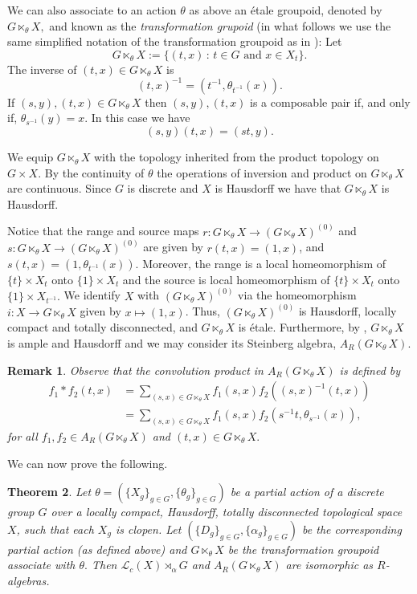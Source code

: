 \documentclass[11pt, a4paper]{amsart}
\newcommand{\Gx}{\ensuremath {G \ltimes_\theta X}}
\newcommand{\Lg}{\ensuremath {\mathcal{L}_c(X)\rtimes_{\alpha} G}}
\theoremstyle{plain}
\newtheorem{theorem}{Theorem}[section]
\newtheorem{remark}[theorem]{Remark}
\begin{document}


We can also associate to an action $\theta$ as above an \'{e}tale groupoid, denoted by $\Gx,$ and known as the \emph{transformation grupoid}  (in what follows we use the same simplified notation of the transformation groupoid as in \cite{Abadie}): Let
 $$\Gx:= \{(t,x) \, : \, t \in G \,\, \mbox{and} \,\, x \in X_t \}.$$
The inverse of $(t, x) \in \Gx$ is 
$$(t, x)^{-1}=(t^{-1}, \theta_{t^{-1}}(x)).$$
If $(s,y), (t,x) \in \Gx$ then $(s,y), (t,x) $ is a composable pair if, and only if, $\theta_{s^{-1}}(y)=x.$ In this case we have
$$(s,y)(t,x)=(st, y).$$

We equip $\Gx$ with the topology inherited from the product topology on $G \times X.$  By the continuity of $\theta$ the
operations of inversion and product on $\Gx$ are continuous. Since $G$ is discrete and $X$ is Hausdorff we have that $\Gx$ is Hausdorff. 

Notice that the range and source maps $r: \Gx \rightarrow  (\Gx)^{(0)}$ and $s : \Gx \rightarrow (\Gx)^{(0)}$ are given by $r(t,x) =(1,x)$, and $s(t,x)=(1, \theta_{t^{-1}}(x)).$ Moreover, the range is a local homeomorphism of $\{t\} \times X_t$ onto $\{1\} \times X_t$  and the source is local homeomorphism of $\{t\} \times X_t$ onto $\{1\} \times X_{t^{-1}}.$ We identify $X$ with $(\Gx)^{(0)}$ via the homeomorphism $i: X \rightarrow \Gx$ given by $x \mapsto (1, x)$. Thus, $(\Gx)^{(0)}$ is Hausdorff, locally compact and totally disconnected, and $\Gx$ is \'{e}tale. Furthermore, by \cite[Proposition~4.1]{Exel2}, $\Gx$ is ample and Hausdorff and we may consider its Steinberg algebra, $A_R(\Gx)$.

\begin{remark} Observe that the convolution product in $A_R(\Gx)$ is defined by 
\begin{align*}
f_1*f_2(t,x) & = \sum_{(s,x)\in \Gx}f_1(s,x)f_2((s,x)^{-1}(t,x)) \\
             & = \sum_{(s,x)\in \Gx}f_1(s,x)f_2(s^{-1}t,\theta_{s^{-1}}(x)),
\end{align*}
for all $f_1, f_2 \in A_R(\Gx)$ and $(t,x) \in \Gx.$
\end{remark}

We can now prove the following.

\begin{theorem}\label{theorisomortransfgrou}
Let $\theta=(\{X_g\}_{g \in G}, \{\theta_g\}_{g \in G})$ be a partial action of a discrete group $G$ over a locally compact, Hausdorff, totally disconnected topological space $X$, such that each $X_g$ is clopen. Let $(\{D_g\}_{g \in G}, \{\alpha_g\}_{g\in G})$ be the corresponding partial action (as defined above) and $\Gx$ be the transformation groupoid associate with $\theta.$ Then $\Lg$ and $A_R(\Gx)$ are isomorphic as $R$-algebras. 
\end{theorem}
\end{document}
